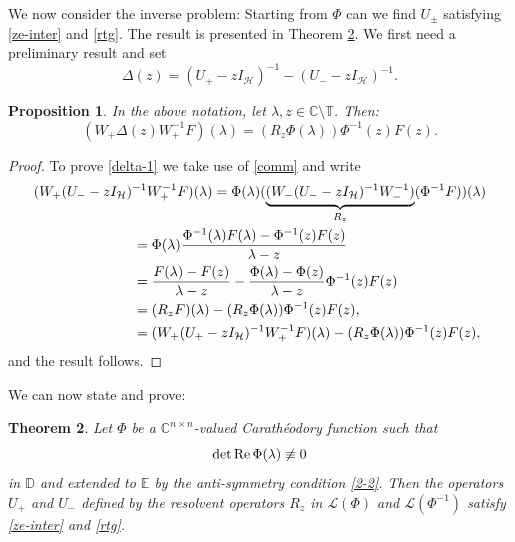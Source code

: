 \documentclass[12pt]{amsart}
\newtheorem{thm}{Theorem}[section]
\newtheorem{prop}[thm]{Proposition}
\theoremstyle{definition}
\theoremstyle{remark}
\numberwithin{equation}{section}
\begin{document}
We now consider the inverse problem: Starting from $\Phi$ can we find $U_\pm$ satisfying \eqref{ze-inter} and \eqref{rtg}. The result is presented in Theorem
\ref{isp}. We first need a preliminary result and set
  \begin{equation}
    \Delta(z)=(U_+-zI_{\mathcal H})^{-1}-(U_--zI_{\mathcal H})^{-1}.
  \end{equation}

\begin{prop}
  In the above notation,
let $\lambda,z\in\mathbb C\setminus\mathbb T$. Then:
  \begin{equation}
    \label{delta-1}
(W_+\Delta(z)W_+^{-1}F)(\lambda)=(R_z\Phi(\lambda))\Phi^{-1}(z)F(z).
\end{equation}
  \label{prop11}
  \end{prop}
  \begin{proof}

To prove \eqref{delta-1} we take use of \eqref{comm} and write
\[
\begin{split}
  (W_+(U_--zI_{\mathcal H})^{-1}W_+^{-1}F)(\lambda)&=\Phi(\lambda)(\underbrace{( W_-(U_--zI_{\mathcal H})^{-1}W_-^{-1})}_{R_z}(\Phi^{-1}F))(\lambda)\\
  &\hspace{-2cm}=\Phi(\lambda)\frac{\Phi^{-1}(\lambda)F(\lambda)-\Phi^{-1}(z)F(z)}{\lambda-z}\\
  &\hspace{-2cm}=\frac{F(\lambda)-F(z)}{\lambda-z}-\frac{\Phi(\lambda)-\Phi(z)}{\lambda-z}\Phi^{-1}(z)F(z)\\
  &\hspace{-2cm}=(R_zF)(\lambda)-(R_z\Phi(\lambda))\Phi^{-1}(z)F(z),\\
  &\hspace{-2cm}=(W_+(U_+-zI_{\mathcal H})^{-1}W_+^{-1}F)(\lambda)-(R_z\Phi(\lambda))\Phi^{-1}(z)F(z),\\
\end{split}
\]
and the result follows.
    \end{proof}

We can now state and prove:

\begin{thm}
  \label{isp}
  Let $\Phi$ be a $\mathbb C^{n\times n}$-valued Carath\'eodory function such that
\[
  \det \mbox{{\rm Re}}\,\Phi({\lambda})\not\equiv0
\]
  in $\mathbb D$ and extended to $\mathbb E$ by
  the anti-symmetry condition \eqref{2-2}. Then the operators $U_+$ and $U_-$ defined by the resolvent operators $R_z$ in $\mathcal L(\Phi)$ and $\mathcal L(\Phi^{-1})$
  satisfy \eqref{ze-inter} and \eqref{rtg}.
\end{thm}
\end{document}
